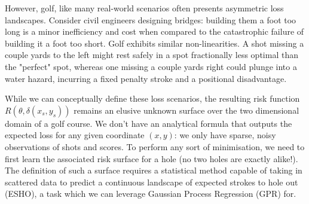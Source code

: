 \documentclass[11pt, letterpaper]{article}
\begin{document}
However, golf, like many real-world scenarios often presents asymmetric loss landscapes. Consider civil engineers designing bridges: building them a foot too long is a minor inefficiency and cost when compared to the catastrophic failure of building it a foot too short. Golf exhibits similar non-linearities. A shot missing a couple yards to the left might rest safely in a spot fractionally less optimal than the "perfect" spot, whereas one missing a couple yards right could plunge into a water hazard, incurring a fixed penalty stroke and a positional disadvantage.

While we can conceptually define these loss scenarios, the resulting risk function $R(\theta, \delta(x_s,y_s))$ remains an elusive unknown surface over the two dimensional domain of a golf course. We don't have an analytical formula that outputs the expected loss for any given coordinate $(x,y)$: we only have sparse, noisy observations of shots and scores. To perform any sort of minimisation, we need to first learn the associated risk surface for a hole (no two holes are exactly alike!). The definition of such a surface requires a statistical method capable of taking in scattered data to predict a continuous landscape of expected strokes to hole out (ESHO), a task which we can leverage Gaussian Process Regression (GPR) for. 
\end{document}
